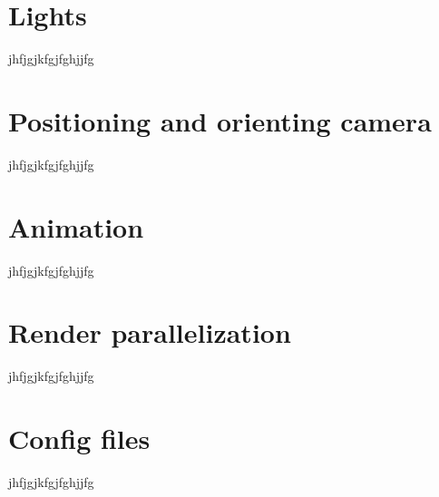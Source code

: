 \documentclass[12pt]{report}
\begin{document}
\chapter{Lights}
jhfjgjkfgjfghjjfg

\chapter{Positioning and orienting camera}
jhfjgjkfgjfghjjfg

\chapter{Animation}
jhfjgjkfgjfghjjfg

\chapter{Render parallelization}
jhfjgjkfgjfghjjfg

\chapter{Config files}
jhfjgjkfgjfghjjfg
\end{document}
